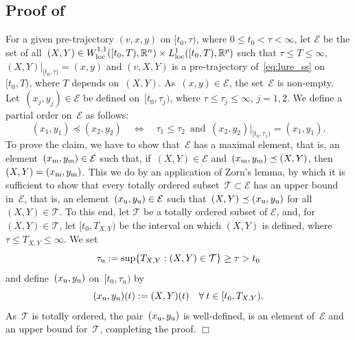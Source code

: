 \documentclass[a4paper,11pt]{article}
\newcommand{\R}{\mathbb R}
\newcommand{\sE}{{\mathcal E}}
\newcommand{\sT}{{\mathcal T}}
\numberwithin{equation}{section}
\numberwithin{figure}{section}
\numberwithin{table}{section}
\begin{document}
\subsection{Proof of }
%
For a given pre-trajectory $(v,x,y)$ on $[t_0,\tau)$, where $0\leq t_0<\tau<\infty$, let
$\sE$ be the set of all~$(X,Y)\in W^{1,1}_{\rm loc}([t_0,T),\R^n)\times L^1_{\rm loc}([t_0,T),\R^p)$ such that $\tau\leq T\leq\infty$,~$(X,Y)|_{[t_0,\tau)}=(x,y)$ and $(v,X,Y)$ is a pre-trajectory of~\eqref{eq:lure_ss} on $[t_0,T)$, where
$T$ depends on~$(X,Y)$. As~$(x,y)\in\sE$, the set~$\sE$ is non-empty. Let~$(x_j,y_j)\in\sE$ be defined on~$[t_0,\tau_j)$, where $\tau\leq\tau_j\leq\infty$, $j=1,2$. We define a partial order on~$\sE$ as follows:
\[
(x_1,y_1)\preceq(x_2,y_2)\quad\Longleftrightarrow\quad\tau_1\leq\tau_2\,\,\,\mbox{and}\,\,\,
(x_2,y_2)|_{[t_0,\tau_1)}=(x_1,y_1).
\]
To prove the claim, we have to show that~$\sE$ has a maximal element, that is, an element~$(x_{\rm m},y_{\rm m})\in\sE$ such that, if~$(X,Y)\in\sE$ and~$(x_{\rm m},y_{\rm m})\preceq
(X,Y)$, then~$(X,Y)=(x_{\rm m},y_{\rm m})$. This we do by an application of Zorn's lemma, by which it is sufficient to show that every totally ordered subset~$\sT\subset\sE$ has an upper bound in~$\sE$, that is, an element~$(x_{\rm u},y_{\rm u})\in\sE$ such that~$(X,Y)\preceq
(x_{\rm u},y_{\rm u})$ for all~$(X,Y)\in\sT$. To this end, let $\sT$ be a totally ordered subset of $\sE$, and, for $(X,Y)\in\sT$, let $[t_0,T_{X,Y})$ be the interval on which $(X,Y)$ is defined, where $\tau\leq T_{X,Y}\leq\infty$. We set
\[
\tau_{\rm u}:=\sup\{T_{X,Y}:(X,Y)\in\sT\}\geq\tau>t_0
\]
and define~$(x_{\rm u},y_{\rm u})$ on~$[t_0,\tau_u)$ by
\[
(x_{\rm u},y_{\rm u})(t):=(X,Y)(t)\quad\forall\:t\in[t_0,T_{X,Y}).
\]
As~$\sT$ is totally ordered, the pair~$(x_{\rm u},y_{\rm u})$ is well-defined, is an element
of~$\sE$ and an upper bound for~$\sT$, completing the proof.
\hfill$\Box$
%
%
\end{document}
